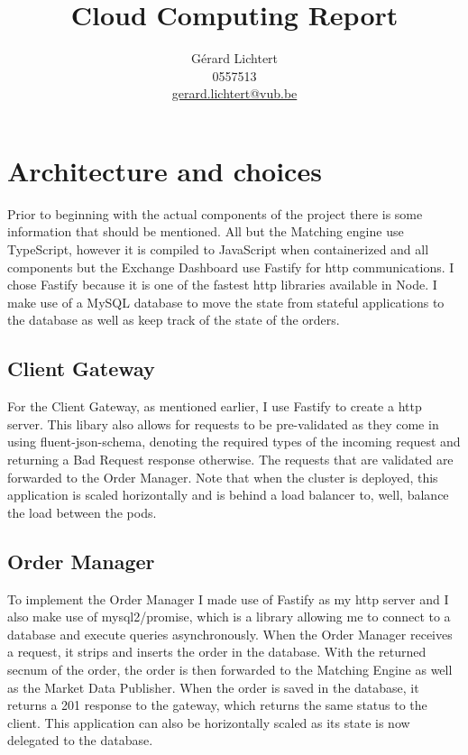 \documentclass{article}
\title{Cloud Computing Report}
\author{Gérard Lichtert \\
0557513\\
\href{mailto:gerard.lichtert@vub.be}{gerard.lichtert@vub.be}}
\begin{document}
\maketitle
\tableofcontents
\newpage

\section{Architecture and choices}
Prior to beginning with the actual components of the project there is some information that should be mentioned.
All but the Matching engine use TypeScript, however it is compiled to JavaScript when containerized and all components but the Exchange Dashboard use Fastify for http communications.
I chose Fastify because it is one of the fastest http libraries available in Node.
I make use of a MySQL database to move the state from stateful applications to the database as well as keep track of the state of the orders.
\subsection{Client Gateway}
For the Client Gateway, as mentioned earlier, I use Fastify to create a http server. This libary also allows for requests to be pre-validated as they come in using fluent-json-schema, denoting the required types of the incoming request and returning a Bad Request response otherwise. The requests that are validated are forwarded to the Order Manager. Note that when the cluster is deployed, this application is scaled horizontally and is behind a load balancer to, well, balance the load between the pods.
\subsection{Order Manager}
To implement the Order Manager I made use of Fastify as my http server and I also make use of mysql2/promise, which is a library allowing me to connect to a database and execute queries asynchronously. When the Order Manager receives a request, it strips and inserts the order in the database. With the returned secnum of the order, the order is then forwarded to the Matching Engine as well as the Market Data Publisher. When the order is saved in the database, it returns a 201 response to the gateway, which returns the same status to the client.
This application can also be horizontally scaled as its state is now delegated to the database.
\end{document}
